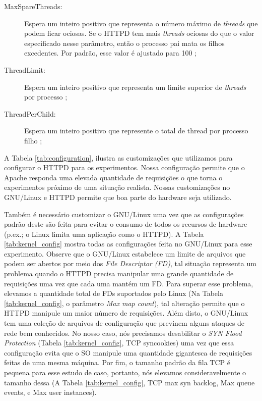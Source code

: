 \begin{description}
  \item [MaxSpareThreads:]
Espera um inteiro positivo que representa o número máximo de \emph{threads} que podem
ficar ociosas. Se o HTTPD tem mais \emph{threads} ociosas do que o valor especificado
nesse parâmetro, então o processo pai mata os filhos excedentes. Por padrão,
esse valor é ajustado para 100 \citep{mpm_maxsparethreads};

  \item [ThreadLimit:]
Espera um inteiro positivo que representa um limite superior de \emph{threads} por
processo \citep{mpm_threadlimits};

  \item [ThreadPerChild:]
Espera um inteiro positivo que represente o total de thread por processo filho
\citep{mpm_threadperchild};

\end{description}



A Tabela \ref{tab:configuration}, ilustra as customizações que utilizamos para
configurar o HTTPD para os experimentos. Nossa configuração permite que o
Apache responda uma elevada quantidade de requisições o que torna o
experimentos próximo de uma situação realista. Nossas customizações no
GNU/Linux e HTTPD permite que boa parte do hardware seja utilizado.



Também é necessário customizar o GNU/Linux uma vez que as configurações padrão
deste são feita para evitar o consumo de todos os recursos de hardware (p.ex.; o
Linux limita uma aplicação como o HTTPD). A Tabela \ref{tab:kernel_config}
mostra todas as configurações feita no GNU/Linux para esse experimento.
Observe que o GNU/Linux estabelece um limite de arquivos que podem ser abertos
por meio dos \emph{File Descriptor (FD)}, tal situação representa um problema
quando o HTTPD precisa manipular uma grande quantidade de requisições uma vez que cada uma
mantém um FD. Para superar esse problema, elevamos a quantidade
total de FDs suportados pelo Linux (Na Tabela \ref{tab:kernel_config}, o
parâmetro \emph{Max map count}), tal alteração permite que o HTTPD manipule um
maior número de requisições. Além disto, o GNU/Linux tem uma coleção de
arquivos de configuração que previnem alguns ataques de rede bem conhecidos. No
nosso caso, nós precisamos desabilitar o \emph{SYN Flood Protection} (Tabela
\ref{tab:kernel_config}, TCP syncookies) uma vez que essa configuração evita
que o SO manipule uma quantidade gigantesca de requisições feitas de uma mesma
máquina. Por fim, o tamanho padrão da fila TCP é pequena para esse estudo de
caso, portanto, nós elevamos consideravelmente o tamanho dessa (A Tabela
\ref{tab:kernel_config}, TCP max syn backlog, Max queue events, e Max user
instances).

